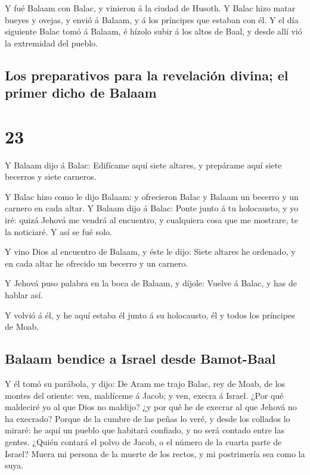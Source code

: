  Y fué Balaam con Balac, y vinieron á la ciudad de
Husoth.  Y Balac hizo matar bueyes y ovejas, y envió á
Balaam, y á los príncipes que estaban con él.  Y el día
siguiente Balac tomó á Balaam, é hízolo subir á los altos de Baal, y
desde allí vió la extremidad del pueblo.

\hypertarget{los-preparativos-para-la-revelaciuxf3n-divina-el-primer-dicho-de-balaam}{%
\subsection{Los preparativos para la revelación divina; el primer dicho
de
Balaam}\label{los-preparativos-para-la-revelaciuxf3n-divina-el-primer-dicho-de-balaam}}

\hypertarget{section-04-23}{%
\section{23}\label{section-04-23}}

 Y Balaam dijo á Balac: Edifícame aquí siete altares, y
prepárame aquí siete becerros y siete carneros.

 Y Balac hizo como le dijo Balaam: y ofrecieron Balac y
Balaam un becerro y un carnero en cada altar.  Y Balaam
dijo á Balac: Ponte junto á tu holocausto, y yo iré: quizá Jehová me
vendrá al encuentro, y cualquiera cosa que me mostrare, te la noticiaré.
Y así se fué solo.

 Y vino Dios al encuentro de Balaam, y éste le dijo: Siete
altares he ordenado, y en cada altar he ofrecido un becerro y un
carnero.

 Y Jehová puso palabra en la boca de Balaam, y díjole:
Vuelve á Balac, y has de hablar así.

 Y volvió á él, y he aquí estaba él junto á su holocausto,
él y todos los príncipes de Moab.

\hypertarget{balaam-bendice-a-israel-desde-bamot-baal}{%
\subsection{Balaam bendice a Israel desde
Bamot-Baal}\label{balaam-bendice-a-israel-desde-bamot-baal}}

 Y él tomó su parábola, y dijo: De Aram me trajo Balac,
rey de Moab, de los montes del oriente: ven, maldíceme á Jacob; y ven,
execra á Israel.  ¿Por qué maldeciré yo al que Dios no
maldijo? ¿y por qué he de execrar al que Jehová no ha execrado?
 Porque de la cumbre de las peñas lo veré, y desde los
collados lo miraré: he aquí un pueblo que habitará confiado, y no será
contado entre las gentes.  ¿Quién contará el polvo de
Jacob, o el número de la cuarta parte de Israel? Muera mi persona de la
muerte de los rectos, y mi postrimería sea como la suya.

